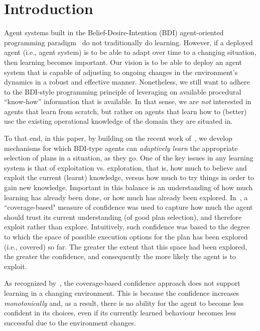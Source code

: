 \section{Introduction}\label{sec:introduction}

Agent systems built in the Belief-Desire-Intention (BDI) agent-oriented programming paradigm~\cite{Georgeff89-PRS,Rao96:AgentSpeak,WooldridgeBook} do not traditionally do learning. 
However, if a deployed agent (i.e., agent system) is to be able to adapt over time to a changing situation, then learning becomes important. Our vision is to be able to deploy an agent system that is capable of adjusting to ongoing changes in the environment's dynamics in a robust and effective manner. Nonetheless, we still want to adhere to the BDI-style programming principle of leveraging on available procedural ``know-how'' information that is available. In that sense, we are \emph{not} interested in agents that learn from scratch, but rather on agents that learn how to (better) use the existing operational knowledge of the domain they are situated in. 



To that end, in this paper, by building on the recent work of~\cite{airiau09:enhancing,singh10:extending,singh10:learning}, we develop mechanisms for which BDI-type agents can \emph{adaptively learn} the appropriate selection of plans in a situation, as they go. 
One of the key issues in any learning system is that of exploitation vs. exploration, that is, how much to believe and exploit the current (learnt) knowledge, versus how much to try things in order to gain new knowledge. Important in this balance is an understanding of how much learning has already been done, or how much has already been explored. In~\cite{singh10:extending,singh10:learning}, a ``coverage-based" measure of confidence was used to capture how much the agent should trust its current understanding (of good plan selection), and therefore exploit rather than explore. Intuitively, such confidence was based to the degree to which the space of possible execution options for the plan has been explored (i.e., covered) so far. The greater the extent that this space had been explored, the greater the confidence, and consequently the more likely the agent is to exploit.  

As recognized by~\cite{singh10:learning}, the coverage-based confidence approach does not support learning in a changing environment. This is because the confidence increases \emph{monotonically} and, as a result, there is no ability for the agent to become less confident in its choices, even if its currently learned behaviour becomes less successful due to the environment changes.



